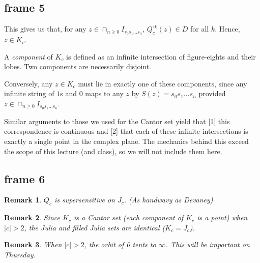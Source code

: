 \documentclass[xcolor=x11names,compress]{beamer}
\renewcommand{\(}{\begin{columns}}
\renewcommand{\)}{\end{columns}}
\newcommand{\<}[1]{\begin{column}{#1}}
\renewcommand{\>}{\end{column}}
\newtheorem{rmk}{Remark}
\begin{document}
\subsection{frame 5}
\begin{frame}

This gives us that, for any $z \in \cap_{n\ge 0} I_{s_0s_1\ldots s_n}$, $Q_c^{\circ k} (z) \in D$ for all $k$. Hence, $z \in K_c$.

\vspace{0.4cm}
\pause

A \textsl{component} of $K_c$ is defined as an infinite intersection of figure-eights and their lobes. Two components are necessarily disjoint.

\vspace{0.4cm}
\pause

Conversely, any $z \in K_c$ must lie in exactly one of these components, since any infinite string of $1$s and $0$
maps to any $z$ by $S(z) = s_0s_1\ldots s_n$ provided $z\in \cap_{n\ge 0} I_{s_0s_1 \ldots s_n}$.

\vspace{0.4cm}
\pause

Similar arguments to those we used for the Cantor set yield that [1] this correspondence is continuous and [2] that each of these infinite intersections is exactly a single point in the complex plane. The mechanics behind this exceed the scope of this lecture (and class), so we will not include them here.



\end{frame}




\subsection{frame 6}
\begin{frame}


\begin{rmk}
$Q_c$ is supersensitive on $J_c$. (As handwavy as Devaney)
\end{rmk}


\begin{rmk}
Since $K_c$ is a Cantor set (each component of $K_c$ is a point) when $|c| > 2$, the Julia and filled Julia sets are identical ($K_c = J_c$).
\end{rmk}

\begin{rmk}
When $|c| > 2$, the orbit of 0 tents to $\infty$. This will be important on Thursday.
\end{rmk}

\end{frame}
\end{document}
